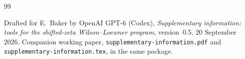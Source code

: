 \begin{thebibliography}{99}
\raggedright
{}
Drafted for E.~Baker by OpenAI GPT-6 (Codex),
\emph{Supplementary information: tools for the shifted-zeta
Wilson--Loewner program}, version~0.5, 20 September 2026.
Companion working paper, \nolinkurl{supplementary-information.pdf}
and \nolinkurl{supplementary-information.tex}, in the same package.

\end{thebibliography}
